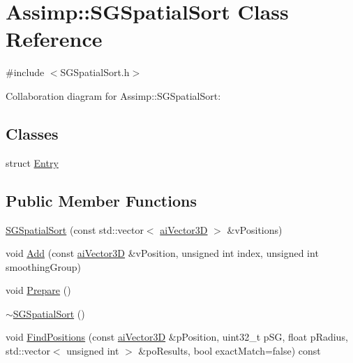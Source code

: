 \hypertarget{class_assimp_1_1_s_g_spatial_sort}{\section{Assimp\+:\+:S\+G\+Spatial\+Sort Class Reference}
\label{class_assimp_1_1_s_g_spatial_sort}
}


{\ttfamily \#include $<$S\+G\+Spatial\+Sort.\+h$>$}



Collaboration diagram for Assimp\+:\+:S\+G\+Spatial\+Sort\+:
\subsection*{Classes}
\begin{DoxyCompactItemize}
\item 
struct \hyperlink{struct_assimp_1_1_s_g_spatial_sort_1_1_entry}{Entry}
\end{DoxyCompactItemize}
\subsection*{Public Member Functions}
\begin{DoxyCompactItemize}
\item 
\hyperlink{class_assimp_1_1_s_g_spatial_sort_a03c330e8cdf61d8b33e6de8893e235e6}{S\+G\+Spatial\+Sort} (const std\+::vector$<$ \hyperlink{structai_vector3_d}{ai\+Vector3\+D} $>$ \&v\+Positions)
\item 
void \hyperlink{class_assimp_1_1_s_g_spatial_sort_a24526386f7e955bf6ababc5f773fc4ff}{Add} (const \hyperlink{structai_vector3_d}{ai\+Vector3\+D} \&v\+Position, unsigned int index, unsigned int smoothing\+Group)
\item 
void \hyperlink{class_assimp_1_1_s_g_spatial_sort_a9332981cca6eff5117d374171869f30a}{Prepare} ()
\item 
\hyperlink{class_assimp_1_1_s_g_spatial_sort_a081e0100a570057d2e1392cbd0c2ba2e}{$\sim$\+S\+G\+Spatial\+Sort} ()
\item 
void \hyperlink{class_assimp_1_1_s_g_spatial_sort_ae539e62171d45b97df742e014247051e}{Find\+Positions} (const \hyperlink{structai_vector3_d}{ai\+Vector3\+D} \&p\+Position, uint32\+\_\+t p\+S\+G, float p\+Radius, std\+::vector$<$ unsigned int $>$ \&po\+Results, bool exact\+Match=false) const 
\end{DoxyCompactItemize}
